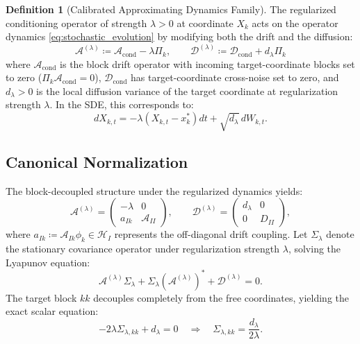 \documentclass[11pt]{amsart}
\theoremstyle{plain}
\theoremstyle{definition}
\newtheorem{definition}[theorem]{Definition}
\theoremstyle{remark}
\newcommand{\cond}{\operatorname{cond}}
\begin{document}
\begin{definition}[Calibrated Approximating Dynamics Family]
  \label{def:soft_do}
  The regularized conditioning operator of strength $\lambda > 0$ at coordinate $X_k$ acts on the operator dynamics \eqref{eq:stochastic_evolution} by modifying both the drift and the diffusion:
  \begin{equation}
    \label{eq:soft_do_sde}
    \mathcal{A}^{(\lambda)} \coloneqq \mathcal{A}_{\cond} - \lambda \Pi_k, \qquad
    \mathcal{D}^{(\lambda)} \coloneqq \mathcal{D}_{\cond} + d_\lambda \Pi_k
  \end{equation}
  where $\mathcal{A}_{\cond}$ is the block drift operator with incoming target-coordinate blocks set to zero ($\Pi_k \mathcal{A}_{\cond} = 0$), $\mathcal{D}_{\cond}$ has target-coordinate cross-noise set to zero, and $d_\lambda > 0$ is the local diffusion variance of the target coordinate at regularization strength $\lambda$. In the SDE, this corresponds to:
  \begin{equation}
    \label{eq:soft_do_sde_general}
    dX_{k,t} = -\lambda (X_{k,t} - x_k^*) dt + \sqrt{d_\lambda}\, dW_{k,t}.
  \end{equation}
\end{definition}

\subsection{Canonical Normalization}
\label{sec:setup:calibration}

The block-decoupled structure under the regularized dynamics yields:
\begin{equation}
  \mathcal{A}^{(\lambda)}=
  \begin{pmatrix}-\lambda&0\\a_{Ik}&\mathcal{A}_{II}\end{pmatrix},\qquad
  \mathcal{D}^{(\lambda)}=
  \begin{pmatrix}d_\lambda&0\\0&D_{II}\end{pmatrix},
\end{equation}
where $a_{Ik} \coloneqq \mathcal{A}_{Ik} \phi_k \in \mathcal{H}_I$ represents the off-diagonal drift coupling.
Let $\Sigma_\lambda$ denote the stationary covariance operator under regularization strength $\lambda$, solving the Lyapunov equation:
\begin{equation}
  \mathcal{A}^{(\lambda)}\Sigma_\lambda + \Sigma_\lambda(\mathcal{A}^{(\lambda)})^* + \mathcal{D}^{(\lambda)} = 0.
\end{equation}
The target block $kk$ decouples completely from the free coordinates, yielding the exact scalar equation:
\begin{equation}
  -2\lambda\Sigma_{\lambda,kk} + d_\lambda = 0 \quad \Longrightarrow \quad \Sigma_{\lambda,kk} = \frac{d_\lambda}{2\lambda}.
\end{equation}
\end{document}
